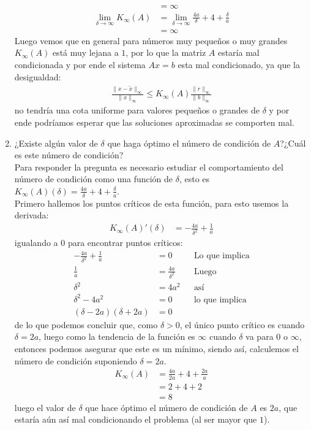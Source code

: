 \begin{homeworkProblem}
\begin{solucion}
\begin{enumerate}
\begin{align*}
          &=\infty\\
          \lim_{\delta \to \infty}K_{\infty}(A)&=\lim_{\delta \to \infty}\frac{4a}{\delta}+4+\frac{\delta}{a}\\
          &=\infty
        \end{align*}
        Luego vemos que en general para números muy pequeños o muy grandes $K_{\infty}(A)$ está muy lejana a $1$, por lo que la matriz $A$ estaría mal condicionada y por ende el sistema $Ax=b$ esta mal condicionado, ya que la desigualdad:
        \begin{align*}
          \frac{\|x-\tilde{x}\|_{\infty}}{\|x\|_{\infty}}\leq K_{\infty}(A)\frac{\|r\|_{\infty}}{\|b\|_{\infty}}
        \end{align*}
        no tendría una cota uniforme para valores pequeños o grandes de $\delta$ y por ende podríamos esperar que las soluciones aproximadas se comporten mal.
      \item ¿Existe algún valor de $\delta$ que haga óptimo el número de condición de $A$?¿Cuál es este número de condición?\\
        Para responder la pregunta es necesario estudiar el comportamiento del número de condición como una función de $\delta$, esto es $K_\infty(A)(\delta)=\frac{4a}{\delta}+4+\frac{\delta}{a}$.\\
        Primero hallemos los puntos críticos de esta función, para esto usemos la derivada:
        \begin{align*}
          K_{\infty}(A)'(\delta)&=-\frac{4a}{\delta^2}+\frac{1}{a}
        \end{align*}
        igualando a $0$ para encontrar puntos críticos:
        \begin{align*}
          -\frac{4a}{\delta^2}+\frac{1}{a}&=0 &&\text{Lo que implica}\\
          \frac{1}{a}&=\frac{4a}{\delta^2} &&\text{Luego}\\
          \delta^2&=4a^2 &&\text{así}\\
          \delta^2-4a^2&=0 &&\text{lo que implica}\\
          (\delta-2a)(\delta+2a)&=0
        \end{align*}
        de lo que podemos concluir que, como $\delta>0$, el único punto crítico es cuando $\delta=2a$, luego como la tendencia de la función es $\infty$ cuando $\delta$ va para $0$ o $\infty$, entonces podemos asegurar que este es un mínimo, siendo así, calculemos el número de condición suponiendo $\delta=2a$.
        \begin{align*}
          K_{\infty}(A)&=\frac{4a}{2a}+4+\frac{2a}{a}\\
          &=2+4+2\\
          &=8
        \end{align*}
        luego el valor de $\delta$ que hace óptimo el número de condición de $A$ es $2a$, que estaría aún así mal condicionando el problema (al ser mayor que $1$). 
    \end{enumerate}
  \end{solucion}
\end{homeworkProblem}
